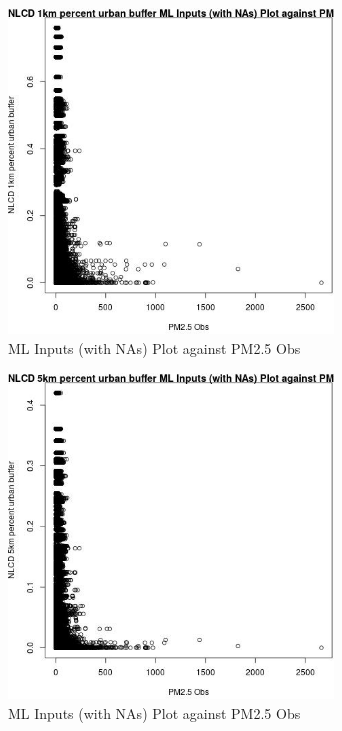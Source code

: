 \begin{figure} 
\centering  
\includegraphics[width=0.77\textwidth]{Code_Outputs/Report_ML_input_PM25_Step4_part_e_de_duplicated_aves_compiled_2019-05-20wNAs_NLCD_1km_percent_urban_buffervPM25_Obs.jpg} 
\caption{\label{fig:Report_ML_input_PM25_Step4_part_e_de_duplicated_aves_compiled_2019-05-20wNAsNLCD_1km_percent_urban_buffervPM25_Obs}ML Inputs (with NAs) Plot against PM2.5 Obs} 
\end{figure} 
 

\begin{figure} 
\centering  
\includegraphics[width=0.77\textwidth]{Code_Outputs/Report_ML_input_PM25_Step4_part_e_de_duplicated_aves_compiled_2019-05-20wNAs_NLCD_5km_percent_urban_buffervPM25_Obs.jpg} 
\caption{\label{fig:Report_ML_input_PM25_Step4_part_e_de_duplicated_aves_compiled_2019-05-20wNAsNLCD_5km_percent_urban_buffervPM25_Obs}ML Inputs (with NAs) Plot against PM2.5 Obs} 
\end{figure} 
 

